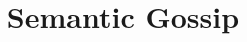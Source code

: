 \documentclass[sigplan,anonymous,nonacm,review]{acmart}
\begin{document}
\title{Semantic Gossip}

\begin{abstract}

\end{abstract}

\maketitle















\end{document}
